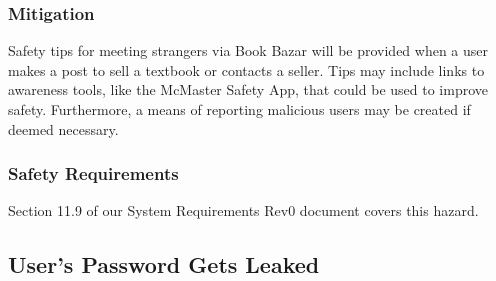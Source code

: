\documentclass[fullpage]{article}
\begin{document}
\subsubsection*{Mitigation}
Safety tips for meeting strangers via Book Bazar will be provided when a user makes a post to sell a textbook or contacts a seller. Tips may include links to awareness tools, like the McMaster Safety App, that could be used to improve safety. Furthermore, a means of reporting malicious users may be created if deemed necessary.

\subsubsection*{Safety Requirements}
Section 11.9 of our System Requirements Rev0 document covers this hazard.

\subsection{User's Password Gets Leaked}
\end{document}
